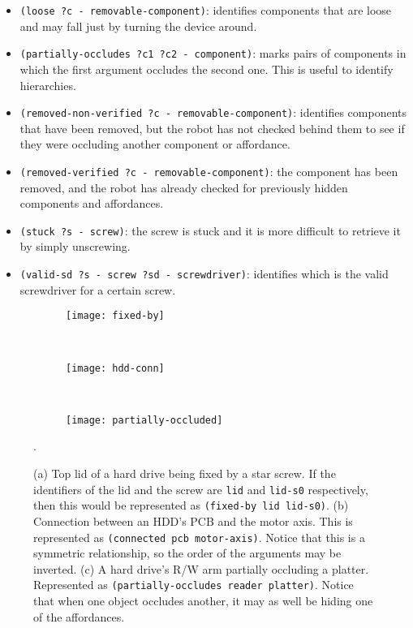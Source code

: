 \documentclass[../root.tex]{subfiles}
\begin{document}
\begin{itemize}
	\item \texttt{(loose ?c - removable-component)}: identifies components
	that are loose and may fall just by turning the device around.
	
	\item \texttt{(partially-occludes ?c1 ?c2 - component)}: marks
	pairs of components in which the first argument occludes the second
	one. This is useful to identify hierarchies.
	
	\item \texttt{(removed-non-verified ?c - removable-component)}:
	identifies components that have been removed, but the robot has not
	checked behind them to see if they were occluding another
	component or affordance.
	
	\item \texttt{(removed-verified ?c - removable-component)}: the
	component has been removed, and the robot has already checked for
	previously hidden components and affordances.
	
	\item \texttt{(stuck ?s - screw)}: the screw is stuck and it is
	more difficult to retrieve it by simply unscrewing.
	
	\item \texttt{(valid-sd ?s - screw ?sd - screwdriver)}: identifies
	which is the valid screwdriver for a certain screw.
\end{itemize}

\begin{figure}[tbhp]
	\centering
	\begin{subfigure}[b]{0.31\columnwidth}
		\texttt{[image: fixed-by]}
		\caption{}
	\end{subfigure}
	~
	\begin{subfigure}[b]{0.31\columnwidth}
		\texttt{[image: hdd-conn]}
		\caption{}
	\end{subfigure}
	~
	\begin{subfigure}[b]{0.31\columnwidth}
		\texttt{[image: partially-occluded]}
		\caption{}
	\end{subfigure}
	\caption{
		(a) Top lid of a hard drive being fixed by a star screw. If the
		identifiers of the lid and the screw are \texttt{lid} and
		\texttt{lid-s0} respectively, then this would be represented
		as \texttt{(fixed-by lid lid-s0)}.
		(b) Connection between an HDD's PCB and the motor axis. This is
		represented as \texttt{(connected pcb motor-axis)}. Notice that
		this is a symmetric relationship, so the order of the arguments
		may be inverted.
		(c) A hard drive's R/W arm partially occluding a platter.
		Represented as \texttt{(partially-occludes reader platter)}.
		Notice that when one object occludes another, it may as well
		be hiding one of the affordances.
	}
	\label{fig:examples-of-device-predicates}. 
\end{figure}
\end{document}
